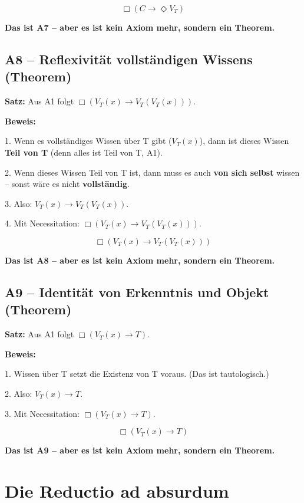 \documentclass[
]{article}
\begin{document}
\[
\boxed{\Box(C \rightarrow \Diamond V_T)}
\]

\textbf{Das ist A7 – aber es ist kein Axiom mehr, sondern ein Theorem.}

\subsection{A8 – Reflexivität vollständigen Wissens (Theorem)}\label{a8-reflexivituxe4t-vollstuxe4ndigen-wissens-theorem}

\textbf{Satz:} Aus A1 folgt \(\Box(V_T(x) \rightarrow V_T(V_T(x)))\).

\textbf{Beweis:}

1. Wenn es vollständiges Wissen über T gibt (\(V_T(x)\)), dann ist dieses Wissen \textbf{Teil von T} (denn alles ist Teil von T, A1).

2. Wenn dieses Wissen Teil von T ist, dann muss es auch \textbf{von sich selbst} wissen – sonst wäre es nicht \textbf{vollständig}.

3. Also: \(V_T(x) \rightarrow V_T(V_T(x))\).

4. Mit Necessitation: \(\Box(V_T(x) \rightarrow V_T(V_T(x)))\).

\[
\boxed{\Box(V_T(x) \rightarrow V_T(V_T(x)))}
\]

\textbf{Das ist A8 – aber es ist kein Axiom mehr, sondern ein Theorem.}

\subsection{A9 – Identität von Erkenntnis und Objekt (Theorem)}\label{a9-identituxe4t-von-erkenntnis-und-objekt-theorem}

\textbf{Satz:} Aus A1 folgt \(\Box(V_T(x) \rightarrow T)\).

\textbf{Beweis:}

1. Wissen über T setzt die Existenz von T voraus. (Das ist tautologisch.)

2. Also: \(V_T(x) \rightarrow T\).

3. Mit Necessitation: \(\Box(V_T(x) \rightarrow T)\).

\[
\boxed{\Box(V_T(x) \rightarrow T)}
\]

\textbf{Das ist A9 – aber es ist kein Axiom mehr, sondern ein Theorem.}

\section{Die Reductio ad absurdum}\label{die-reductio-ad-absurdum}
\end{document}
